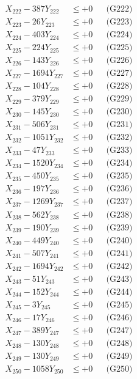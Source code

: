 \documentclass[a4paper,10pt]{article}
\begin{document}
{\begin{align}
X_{222} - 387Y_{222} &\leq +0 && \text{(G222)} \\
X_{223} - 26Y_{223} &\leq +0 && \text{(G223)} \\
X_{224} - 403Y_{224} &\leq +0 && \text{(G224)} \\
X_{225} - 224Y_{225} &\leq +0 && \text{(G225)} \\
X_{226} - 143Y_{226} &\leq +0 && \text{(G226)} \\
X_{227} - 1694Y_{227} &\leq +0 && \text{(G227)} \\
X_{228} - 104Y_{228} &\leq +0 && \text{(G228)} \\
X_{229} - 379Y_{229} &\leq +0 && \text{(G229)} \\
X_{230} - 145Y_{230} &\leq +0 && \text{(G230)} \\
\allowbreak
X_{231} - 506Y_{231} &\leq +0 && \text{(G231)} \\
X_{232} - 1051Y_{232} &\leq +0 && \text{(G232)} \\
X_{233} - 47Y_{233} &\leq +0 && \text{(G233)} \\
X_{234} - 1520Y_{234} &\leq +0 && \text{(G234)} \\
X_{235} - 450Y_{235} &\leq +0 && \text{(G235)} \\
X_{236} - 197Y_{236} &\leq +0 && \text{(G236)} \\
X_{237} - 1269Y_{237} &\leq +0 && \text{(G237)} \\
X_{238} - 562Y_{238} &\leq +0 && \text{(G238)} \\
X_{239} - 190Y_{239} &\leq +0 && \text{(G239)} \\
X_{240} - 449Y_{240} &\leq +0 && \text{(G240)} \\
\allowbreak
X_{241} - 507Y_{241} &\leq +0 && \text{(G241)} \\
X_{242} - 1694Y_{242} &\leq +0 && \text{(G242)} \\
X_{243} - 51Y_{243} &\leq +0 && \text{(G243)} \\
X_{244} - 152Y_{244} &\leq +0 && \text{(G244)} \\
X_{245} - 3Y_{245} &\leq +0 && \text{(G245)} \\
X_{246} - 17Y_{246} &\leq +0 && \text{(G246)} \\
X_{247} - 389Y_{247} &\leq +0 && \text{(G247)} \\
X_{248} - 130Y_{248} &\leq +0 && \text{(G248)} \\
X_{249} - 130Y_{249} &\leq +0 && \text{(G249)} \\
X_{250} - 1058Y_{250} &\leq +0 && \text{(G250)} \\

\end{align}}
\end{document}
